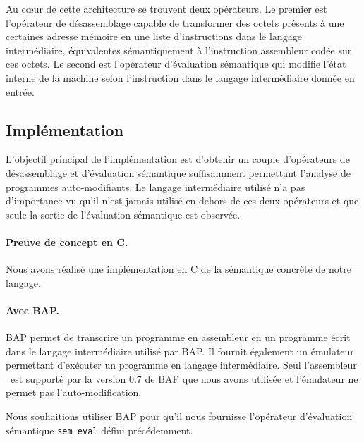 Au c\oe ur de cette architecture se trouvent deux opérateurs. Le premier est l'opérateur de désassemblage capable de transformer des octets présents à une certaines adresse mémoire en une liste d'instructions dans le langage intermédiaire, équivalentes sémantiquement à l'instruction assembleur codée sur ces octets. 
Le second est l'opérateur d'évaluation sémantique qui modifie l'état interne de la machine selon l'instruction dans le langage intermédiaire donnée en entrée.

\subsection{Implémentation}
L'objectif principal de l'implémentation est d'obtenir un couple d'opérateurs de désassemblage et d'évaluation sémantique suffisamment permettant l'analyse de programmes auto-modifiants.
Le langage intermédiaire utilisé n'a pas d'importance vu qu'il n'est jamais utilisé en dehors de ces deux opérateurs et que seule la sortie de l'évaluation sémantique est observée.
\paragraph{Preuve de concept en C.}
Nous avons réalisé une implémentation en C de la sémantique concrète de notre langage.


\paragraph{Avec BAP.}
BAP permet de transcrire un programme en assembleur en un programme écrit dans le langage intermédiaire utilisé par BAP.
Il fournit également un émulateur permettant d'exécuter un programme en langage intermédiaire.
Seul l'assembleur \xq\ est supporté par la version 0.7 de BAP que nous avons utilisée et l'émulateur ne permet pas l'auto-modification.

Nous souhaitions utiliser BAP pour qu'il nous fournisse l'opérateur d'évaluation sémantique \texttt{sem\_eval} défini précédemment.
